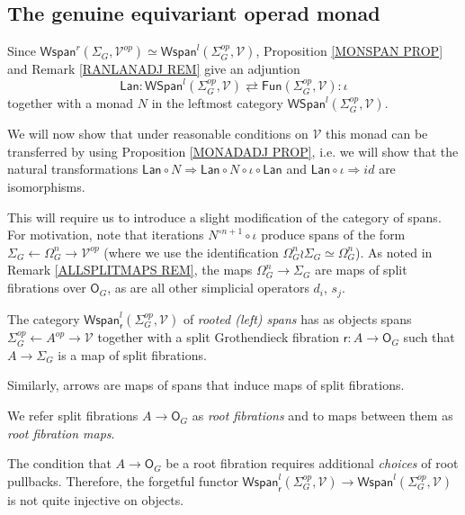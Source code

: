 \documentclass[a4paper,10pt]{article}%
\begin{document}
\subsection{The genuine equivariant operad monad} \label{FGMON SEC}


Since 
$\mathsf{Wspan}^r(\Sigma_G,\mathcal{V}^{op}) \simeq 
\mathsf{Wspan}^l(\Sigma_G^{op},\mathcal{V})$,
Proposition \ref{MONSPAN PROP} and Remark \ref{RANLANADJ REM} give an adjuntion
\begin{equation}\label{LANIOTAADJ EQ}
	\mathsf{Lan} \colon
	\mathsf{WSpan}^l(\Sigma^{op}_G, \mathcal{V})
		\rightleftarrows
	\mathsf{Fun}(\Sigma^{op}_G, \mathcal{V})
	\colon \iota
\end{equation}
together with a monad $N$ in the leftmost category $\mathsf{WSpan}^l(\Sigma^{op}_G, \mathcal{V})$.


We will now show that under reasonable conditions on 
$\mathcal{V}$ this monad can be transferred by using 
Proposition \ref{MONADADJ PROP},
i.e. we will show that the natural transformations 
$
\mathsf{Lan} \circ N \Rightarrow \mathsf{Lan} \circ N \circ \iota \circ \mathsf{Lan}
$
and
$\mathsf{Lan} \circ \iota \Rightarrow id$
are isomorphisms.

This will require us to introduce a slight modification of the category of spans.
For motivation, note that iterations
$N^{\circ n+1} \circ \iota$ produce spans of the form
$\Sigma_G \leftarrow \Omega_G^{n} \to \mathcal{V}^{op}$
(where we use the identification $\Omega_G^{n} \wr \Sigma_G \simeq \Omega_G^{n}$). 
As noted in Remark \ref{ALLSPLITMAPS REM}, the maps 
$\Omega_G^{n} \to \Sigma_G$ are maps of split fibrations over $\mathsf{O}_G$, as are all other simplicial operators $d_i$, $s_j$.

\begin{definition}
The category $\mathsf{Wspan}^l_{\mathsf{r}}(\Sigma_G^{op},\mathcal{V})$ of \textit{rooted (left) spans}
has as objects spans
$\Sigma_G^{op} \leftarrow A^{op} \to \mathcal{V}$
together with a split Grothendieck fibration 
$\mathsf{r} \colon A \to \mathsf{O}_G$
such that $A \to \Sigma_G$ is a map of split fibrations.

Similarly, arrows are maps of spans that induce maps of split fibrations.
\end{definition}

We refer split fibrations $A \to \mathsf{O}_G$
as \textit{root fibrations}
and to maps between them as \textit{root fibration maps}.

\begin{remark}
The condition that $A \to \mathsf{O}_G$
be a root fibration requires additional \textit{choices} of root pullbacks. Therefore, the forgetful functor 
$\mathsf{Wspan}^l_{\mathsf{r}}(\Sigma_G^{op},\mathcal{V})
\to
\mathsf{Wspan}^l(\Sigma_G^{op},\mathcal{V})$
is not quite injective on objects.
\end{remark}
\end{document}
